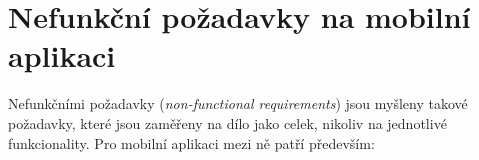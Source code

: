 

\section{Nefunkční požadavky na mobilní aplikaci}
Nefunkčními požadavky (\textit{non-functional requirements}) jsou myšleny takové požadavky, které jsou zaměřeny na dílo jako celek, nikoliv na jednotlivé funkcionality. Pro mobilní aplikaci mezi ně patří především:

